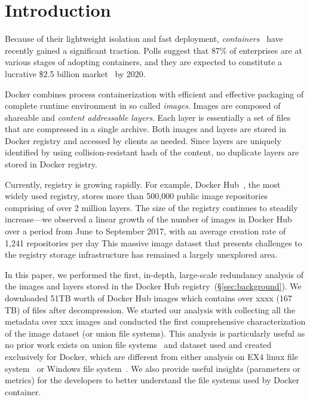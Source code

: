 \section{Introduction}

Because of their lightweight isolation and fast deployment,
\emph{containers}~\cite{process-containers-linux} have recently gained a
significant traction.
%
Polls suggest that 87\% of enterprises are at various stages of adopting
containers, and they are expected to constitute a lucrative \$2.5 billion
market~\cite{container-grow-by2020} by 2020.

Docker combines process containerization with efficient and effective packaging
of complete runtime environment in so called {\em images}.
%
Images are composed of shareable and {\em content addressable layers}.
%
Each layer is essentially a set of files that 
are compressed in a single archive.
%
Both images and layers are stored in Docker registry and accessed by clients as
needed.
%
Since layers are uniquely identified by using collision-resistant hash of the
content, no duplicate layers are stored in Docker registry.

Currently, registry is growing rapidly.
%
For example,   Docker Hub~\cite{docker-hub}, the most widely used registry,
stores more than 500,000 public image repositories comprising of over 2 million
layers.
%
The size of the registry continues to steadily increase---we observed a
linear growth of the number of images in Docker Hub over a period from June to
September 2017, with an average creation rate of 1,241 repositories per day
%
%
This massive image dataset that presents challenges to the registry storage
infrastructure has remained a largely unexplored area.

In this paper, we performed the first, in-depth, large-scale redundancy
analysis of the images and layers stored in the Docker Hub
registry~(\S\ref{sec:background}).
%
We downloaded 51TB worth of Docker Hub images which contains over xxxx (167 TB)
of files after decompression.
%
We started our analysis
with collecting all the metadata over xxx images and  conducted the first
comprehensive characterization of the image dataset (or union file systems). This analysis is particularly useful as no prior work exists on union file
systems~\cite{xxx} and dataset used and created exclusively for Docker,
which are different from either analysis on EX4 linux file system~\cite{xxx} or
Windows file system~\cite{xxx}.
%
We also provide useful insights (parameters or metrics)
for the developers to better
understand the file systems used by Docker container. 

